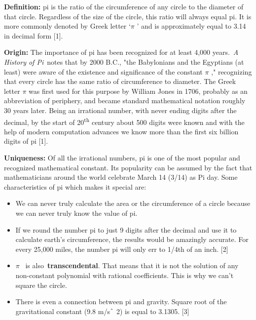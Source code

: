 \documentclass[12pt]{article}
\begin{document}
\textbf{Definition: }pi is the ratio of the circumference of any circle to the diameter of that circle. Regardless of the size of the circle, this ratio will always equal pi. It is more commonly denoted by Greek letter ‘$ \pi $ ’ and is approximately equal to 3.14 in decimal form [1].\par

\begin{justify}
\textbf{Origin: }The importance of pi has been recognized for at least 4,000 years. \textit{A History of Pi} notes that by 2000 B.C., "the Babylonians and the Egyptians (at least) were aware of the existence and significance of the constant $ \pi $ ," recognizing that every circle has the same ratio of circumference to diameter. The Greek letter $ \pi $  was first used for this purpose by William Jones in 1706, probably as an abbreviation of periphery, and became standard mathematical notation roughly 30 years later. Being an irrational number, with never ending digits after the decimal, by the start of 20\textsuperscript{th} century about 500 digits were known and with the help of modern computation advances we know more than the first six billion digits of pi [1].
\end{justify}\par

\begin{justify}
\textbf{Uniqueness: }Of all the irrational numbers, pi is one of the most popular and recognized mathematical constant. Its popularity can be assumed by the fact that mathematicians around the world celebrate March 14 (3/14) as Pi day. Some characteristics of pi which makes it special are:
\end{justify}\par

\begin{itemize}
	\item We can never truly calculate the area or the circumference of a circle because we can never truly know the value of pi.\par

	\item If we round the number pi to just 9 digits after the decimal and use it to calculate earth’s circumference, the results would be amazingly accurate. For every 25,000 miles, the number pi will only err to 1/4th of an inch. [2]\par

	\item $ \pi $  is also \textbf{transcendental}. That means that it is not the solution of any non-constant polynomial with rational coefficients. This is why we can't square the circle.\par

	\item There is even a connection between pi and gravity. Square root of the gravitational constant (9.8 m/s$ \string^ $ 2) is equal to 3.1305. [3] 
\end{itemize}\par
\end{document}
